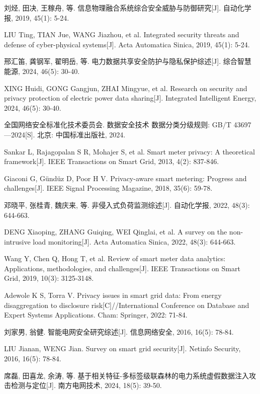刘烃, 田决, 王稼舟, 等. 信息物理融合系统综合安全威胁与防御研究[J]. 自动化学报, 2019, 45(1): 5-24.

LIU Ting, TIAN Jue, WANG Jiazhou, et al. Integrated security threats and defense of cyber-physical systems[J]. Acta Automatica Sinica, 2019, 45(1): 5-24.

邢汇笛, 龚钢军, 翟明岳, 等. 电力数据共享安全防护与隐私保护综述[J]. 综合智慧能源, 2024, 46(5): 30-40.

XING Huidi, GONG Gangjun, ZHAI Mingyue, et al. Research on security and privacy protection of electric power data sharing[J]. Integrated Intelligent Energy, 2024, 46(5): 30-40.

全国网络安全标准化技术委员会. 数据安全技术 数据分类分级规则: GB/T 43697—2024[S]. 北京: 中国标准出版社, 2024.

Sankar L, Rajagopalan S R, Mohajer S, et al. Smart meter privacy: A theoretical framework[J]. IEEE Transactions on Smart Grid, 2013, 4(2): 837-846.

Giaconi G, Gündüz D, Poor H V. Privacy-aware smart metering: Progress and challenges[J]. IEEE Signal Processing Magazine, 2018, 35(6): 59-78.

邓晓平, 张桂青, 魏庆来, 等. 非侵入式负荷监测综述[J]. 自动化学报, 2022, 48(3): 644-663.

DENG Xiaoping, ZHANG Guiqing, WEI Qinglai, et al. A survey on the non-intrusive load monitoring[J]. Acta Automatica Sinica, 2022, 48(3): 644-663.

Wang Y, Chen Q, Hong T, et al. Review of smart meter data analytics: Applications, methodologies, and challenges[J]. IEEE Transactions on Smart Grid, 2019, 10(3): 3125-3148.

Adewole K S, Torra V. Privacy issues in smart grid data: From energy disaggregation to disclosure risk[C]//International Conference on Database and Expert Systems Applications. Cham: Springer, 2022: 71-84.

刘家男, 翁健. 智能电网安全研究综述[J]. 信息网络安全, 2016, 16(5): 78-84.

LIU Jianan, WENG Jian. Survey on smart grid security[J]. Netinfo Security, 2016, 16(5): 78-84.

席磊, 田喜龙, 余涛, 等. 基于相关特征-多标签级联森林的电力系统虚假数据注入攻击检测与定位[J]. 南方电网技术, 2024, 18(5): 39-50.

